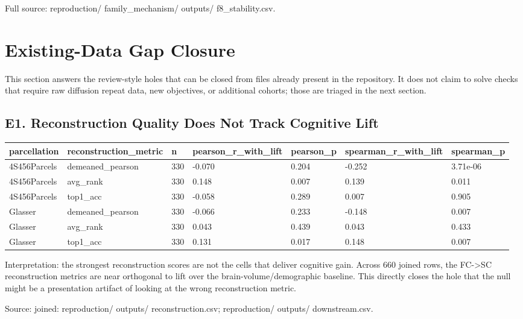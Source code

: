 Full source: reproduction/ family\_mechanism/ outputs/ f8\_stability.csv.

\section{Existing-Data Gap Closure}\label{existing-data-gap-closure}

This section answers the review-style holes that can be closed from files already present in the repository. It does not claim to solve checks that require raw diffusion repeat data, new objectives, or additional cohorts; those are triaged in the next section.

\subsection{E1. Reconstruction Quality Does Not Track Cognitive Lift}\label{e1-reconstruction-quality-does-not-track-cognitive-lift}

{\def\LTcaptype{none} %
\begin{longtable}[]{@{}lllllll@{}}
\toprule\noalign{}
parcellation & reconstruction\_metric & n & pearson\_r\_with\_lift & pearson\_p & spearman\_r\_with\_lift & spearman\_p \\
\midrule\noalign{}
\endhead
\bottomrule\noalign{}
\endlastfoot
4S456Parcels & demeaned\_pearson & 330 & -0.070 & 0.204 & -0.252 & 3.71e-06 \\
4S456Parcels & avg\_rank & 330 & 0.148 & 0.007 & 0.139 & 0.011 \\
4S456Parcels & top1\_acc & 330 & -0.058 & 0.289 & 0.007 & 0.905 \\
Glasser & demeaned\_pearson & 330 & -0.066 & 0.233 & -0.148 & 0.007 \\
Glasser & avg\_rank & 330 & 0.043 & 0.439 & 0.043 & 0.433 \\
Glasser & top1\_acc & 330 & 0.131 & 0.017 & 0.148 & 0.007 \\
\end{longtable}
}

Interpretation: the strongest reconstruction scores are not the cells that deliver cognitive gain. Across 660 joined rows, the FC-\textgreater SC reconstruction metrics are near orthogonal to lift over the brain-volume/demographic baseline. This directly closes the hole that the null might be a presentation artifact of looking at the wrong reconstruction metric.

Source: joined: reproduction/ outputs/ reconstruction.csv; reproduction/ outputs/ downstream.csv.

